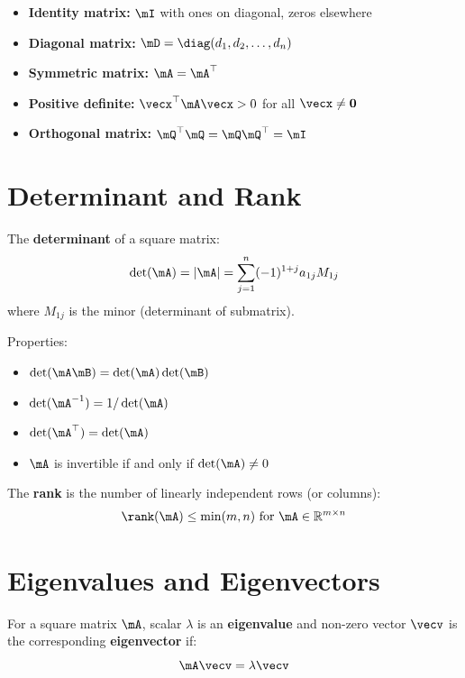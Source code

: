 \begin{itemize}
    \item \textbf{Identity matrix:} $\mI$ with ones on diagonal, zeros elsewhere
    \item \textbf{Diagonal matrix:} $\mD = \diag(d_1, d_2, \ldots, d_n)$
    \item \textbf{Symmetric matrix:} $\mA = \mA^\top$
    \item \textbf{Positive definite:} $\vecx^\top\mA\vecx > 0$ for all $\vecx \neq \mathbf{0}$
    \item \textbf{Orthogonal matrix:} $\mQ^\top\mQ = \mQ\mQ^\top = \mI$
\end{itemize}

\section{Determinant and Rank}

The \textbf{determinant} of a square matrix:
\begin{equation}
\det(\mA) = |\mA| = \sum_{j=1}^n (-1)^{1+j} a_{1j} M_{1j}
\end{equation}
where $M_{1j}$ is the minor (determinant of submatrix).

Properties:
\begin{itemize}
    \item $\det(\mA\mB) = \det(\mA)\det(\mB)$
    \item $\det(\mA^{-1}) = 1/\det(\mA)$
    \item $\det(\mA^\top) = \det(\mA)$
    \item $\mA$ is invertible if and only if $\det(\mA) \neq 0$
\end{itemize}

The \textbf{rank} is the number of linearly independent rows (or columns):
\begin{equation}
\rank(\mA) \leq \min(m, n) \text{ for } \mA \in \mathbb{R}^{m \times n}
\end{equation}

\section{Eigenvalues and Eigenvectors}

\begin{definitionbox}[title=Definition 0.5: Eigenvalue Problem]
For a square matrix $\mA$, scalar $\lambda$ is an \textbf{eigenvalue} and non-zero vector $\vecv$ is the corresponding \textbf{eigenvector} if:
\begin{equation}
\mA\vecv = \lambda\vecv
\end{equation}
\end{definitionbox}

